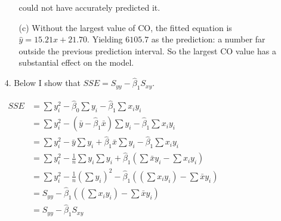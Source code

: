 \documentclass[12pt]{article}
\begin{document}
\begin{enumerate}
\begin{enumerate}
			could not have accurately predicted it.
			\item[(c)] Without the largest value of CO, the fitted equation is $\hat{y} = 15.21x + 21.70$. Yielding $6105.7$ as 
			the prediction: a number far outside the previous prediction interval. So the largest CO value has a substantial 
			effect on the model.
		\end{enumerate}
	\item[4.] Below I show that $SSE = S_{yy} - \hat{\beta}_1S_{xy}$.
		\begin{center}
		\begin{math}
		\begin{aligned}
			SSE &= \sum{y^2_i} - \hat{\beta}_0\sum{y_i} - \hat{\beta}_1\sum{x_iy_i}\\
			&= \sum{y^2_i} - (\bar{y} - \hat{\beta}_1\bar{x})\sum{y_i} - \hat{\beta}_1\sum{x_iy_i}\\
			&= \sum{y^2_i} -\bar{y}\sum{y_i} + \hat{\beta}_1\bar{x}\sum{y_i} - \hat{\beta}_1\sum{x_iy_i}\\
			&= \sum{y^2_i} -\frac{1}{n}\sum{y_i}\sum{y_i} + \hat{\beta}_1(\sum\bar{x}{y_i} - \sum{x_iy_i})\\
			&= \sum{y^2_i} -\frac{1}{n}(\sum{y_i})^2 - \hat{\beta}_1((\sum{x_iy_i}) - \sum{\bar{x}y_i})\\
			&= S_{yy} - \hat{\beta}_1((\sum{x_iy_i}) - \sum{\bar{x}y_i})\\
			&= S_{yy} - \hat{\beta}_1S_{xy}\\
		\end{aligned}
		\end{math}
		\end{center}

\end{enumerate}
\end{document}
